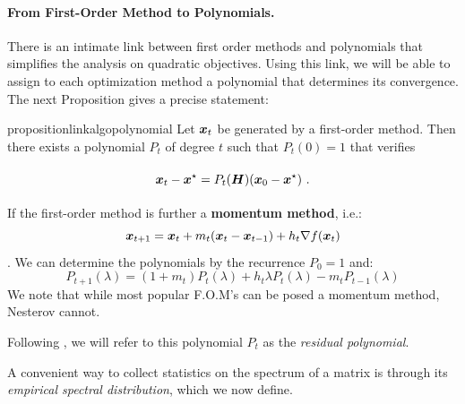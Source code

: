 \documentclass{article}
\begin{document}
\paragraph{From First-Order Method to Polynomials.}
There is an intimate link between first order methods and polynomials that simplifies the analysis on quadratic objectives. Using this link, we will be able to assign to each optimization method a polynomial that determines its convergence. The next Proposition gives a precise statement:


\begin{restatable}{proposition}{linkalgopolynomial}
    \label{prop:link_algo_polynomial} \cite{hestenes1952methods}
    Let ${\boldsymbol x}_t$ be generated by a first-order method. Then there exists a polynomial $P_t$ of degree $t$ such that $P_t(0) = 1$ that verifies
    \begin{equation}\label{eq:polynomial_iterates}
        \vphantom{\sum^n}{\boldsymbol x}_{t}-{\boldsymbol x}^\star = P_t({\boldsymbol H})({\boldsymbol x}_0-{\boldsymbol x}^\star)~.
    \end{equation}
\end{restatable}

\begin{remark} \label{rmk: momentum based}
If the first-order method is further a \textbf{momentum method}, i.e.:
$$
    {\boldsymbol x}_{t+1}={\boldsymbol x}_t+m_t({\boldsymbol x}_t-{\boldsymbol x}_{t-1})+h_t\nabla f({\boldsymbol x}_t)
$$.
We can determine the polynomials by the recurrence $P_0=1$ and:
    \begin{equation*}
        P_{t+1}(\lambda)=(1+m_t)P_t(\lambda)+h_t\lambda P_t(\lambda)-m_tP_{t-1}(\lambda)
    \end{equation*}
We note that while most popular F.O.M's can be posed a momentum method, Nesterov cannot.
\end{remark}

Following \cite{fischer1996polynomial}, we will refer to this polynomial $P_t$ as the \emph{residual polynomial}.




A convenient way to collect statistics on the spectrum of a matrix is through its \emph{empirical spectral distribution}, which we now define. 
\end{document}

